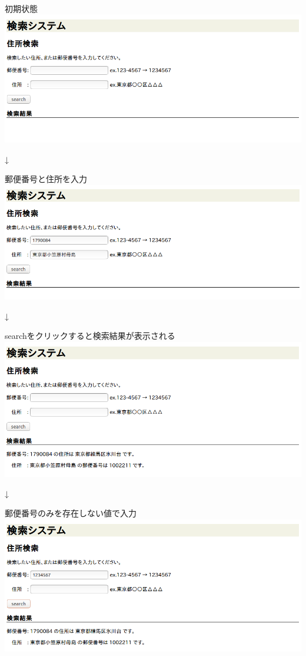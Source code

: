 \documentclass[a4j]{jarticle}
\begin{document}
\begin{center}
初期状態
\includegraphics[width=15cm]{result/result1.png}

{\LARGE↓}

郵便番号と住所を入力
\includegraphics[width=15cm]{result/result2.png}

{\LARGE↓}

searchをクリックすると検索結果が表示される
\includegraphics[width=15cm]{result/result3.png}

{\LARGE↓}

郵便番号のみを存在しない値で入力
\includegraphics[width=15cm]{result/result4.png}


\end{center}
\end{document}
